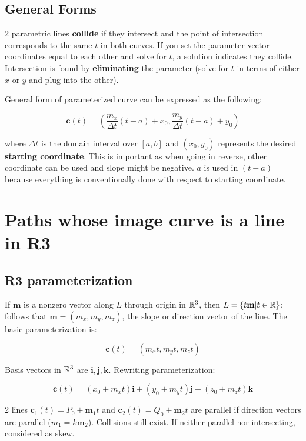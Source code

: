\subsection{General Forms}

2 parametric lines \textbf{collide} if they intersect and the point of intersection corresponds
to the same $t$ in both curves. If you set the parameter vector coordinates equal to each
other and solve for $t$, a solution indicates they collide. Intersection is found by \textbf{eliminating}
the parameter (solve for $t$ in terms of either $x$ or $y$ and plug into the other).\newline

\noindent
General form of parameterized curve can be expressed as the following:

\[\boxed{\textbf{c}(t)=(\frac{m_x}{\Delta t}(t-a)+x_0,\frac{m_y}{\Delta t}(t-a)+y_0)}\]

where $\Delta t$ is the domain interval over $[a,b]$ and $(x_0,y_0)$ represents the desired \textbf{starting coordinate}.
This is important as when going in reverse, other coordinate can be used and slope might be negative.
$a$ is used in $(t-a)$ because everything is conventionally done with respect to starting coordinate.

\section{Paths whose image curve is a line in R3}

\subsection{R3 parameterization}

If $\textbf{m}$ is a nonzero vector along $L$ through origin in $\mathbb{R}^3$, then $L=\{t\textbf{m}|t\in\mathbb{R}\}$;
follows that $\textbf{m}=(m_x,m_y,m_z)$, the slope or direction vector of the line. The basic parameterization is:

\[\textbf{c}(t)=(m_x t,m_y t,m_z t)\]

Basis vectors in $\mathbb{R}^3$ are $\textbf{i}, \textbf{j}, \textbf{k}$. Rewriting parameterization: 

\[\textbf{c}(t)=(x_0+m_x t) \textbf{i}+(y_0+m_y t) \textbf{j}+(z_0+m_z t) \textbf{k}\]

2 lines $\textbf{c}_1(t)=P_0+\textbf{m}_1t$ and $\textbf{c}_2(t)=Q_0+\textbf{m}_2t$ are parallel if
direction vectors are parallel ($\textbf{$m_1$}=k\textbf{m}_2$). Collisions still exist. If neither parallel nor intersecting, considered as skew.\newline

